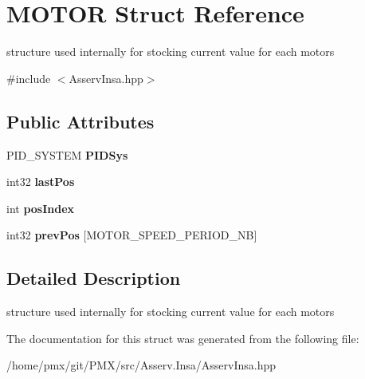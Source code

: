 \hypertarget{structMOTOR}{}\section{M\+O\+T\+OR Struct Reference}
\label{structMOTOR}


structure used internally for stocking current value for each motors  




{\ttfamily \#include $<$Asserv\+Insa.\+hpp$>$}

\subsection*{Public Attributes}
\begin{DoxyCompactItemize}
\item 
\mbox{\label{structMOTOR_ad494bbc3103cda3f35bdd7fc1b5d28ab}} 
P\+I\+D\+\_\+\+S\+Y\+S\+T\+EM {\bfseries P\+I\+D\+Sys}
\item 
\mbox{\label{structMOTOR_a13e2bfbd2f8585027ace0233711f5fcb}} 
int32 {\bfseries last\+Pos}
\item 
\mbox{\label{structMOTOR_a5c9997178b28567b10110ed7bad82d38}} 
int {\bfseries pos\+Index}
\item 
\mbox{\label{structMOTOR_a5d8952a5daa16a34c4a89566b11f6fbb}} 
int32 {\bfseries prev\+Pos} \mbox{[}M\+O\+T\+O\+R\+\_\+\+S\+P\+E\+E\+D\+\_\+\+P\+E\+R\+I\+O\+D\+\_\+\+NB\mbox{]}
\end{DoxyCompactItemize}


\subsection{Detailed Description}
structure used internally for stocking current value for each motors 

The documentation for this struct was generated from the following file\+:\begin{DoxyCompactItemize}
\item 
/home/pmx/git/\+P\+M\+X/src/\+Asserv.\+Insa/Asserv\+Insa.\+hpp\end{DoxyCompactItemize}
